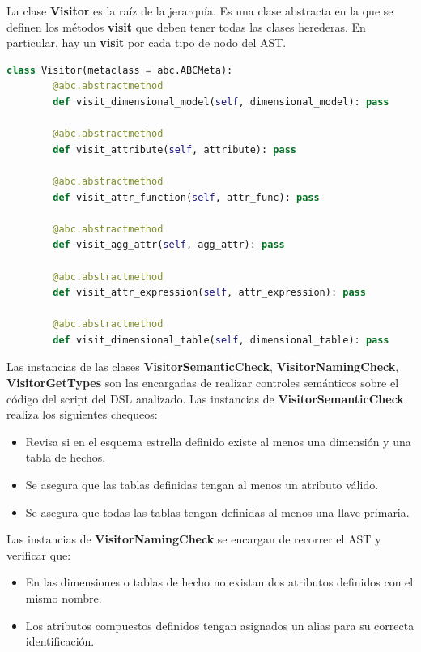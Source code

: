 La clase \textbf{Visitor} es la ra\'iz de la jerarqu\'ia. Es una clase abstracta en la que se definen los m\'etodos 
\textbf{visit} que deben tener todas las clases herederas. En particular, hay un \textbf{visit} por cada tipo de 
nodo del AST. 

\begin{lstlisting}[label={code:visitors}, caption={Clase Visitor}, language={python}]
    class Visitor(metaclass = abc.ABCMeta):
        @abc.abstractmethod
        def visit_dimensional_model(self, dimensional_model): pass 

        @abc.abstractmethod
        def visit_attribute(self, attribute): pass

        @abc.abstractmethod
        def visit_attr_function(self, attr_func): pass

        @abc.abstractmethod
        def visit_agg_attr(self, agg_attr): pass

        @abc.abstractmethod
        def visit_attr_expression(self, attr_expression): pass

        @abc.abstractmethod
        def visit_dimensional_table(self, dimensional_table): pass
\end{lstlisting}

Las instancias de las clases \textbf{VisitorSemanticCheck}, \textbf{VisitorNamingCheck}, \textbf{VisitorGetTypes} 
son las encargadas de realizar
controles sem\'anticos sobre el c\'odigo del script del DSL analizado. Las instancias de \textbf{VisitorSemanticCheck} realiza los siguientes 
chequeos:

\begin{itemize}
    \item Revisa si en el esquema estrella definido existe al menos una dimensi\'on y una tabla de hechos.
    \item Se asegura que las tablas definidas tengan al menos un atributo v\'alido.
    \item Se asegura que todas las tablas tengan definidas al menos una llave primaria.
\end{itemize}

Las instancias de \textbf{VisitorNamingCheck} se encargan de recorrer el AST y verificar que: 

\begin{itemize}
    \item En las dimensiones o tablas de hecho no existan dos atributos definidos con el mismo nombre.
    \item Los atributos compuestos definidos tengan asignados un alias para su correcta identificaci\'on.
\end{itemize}

